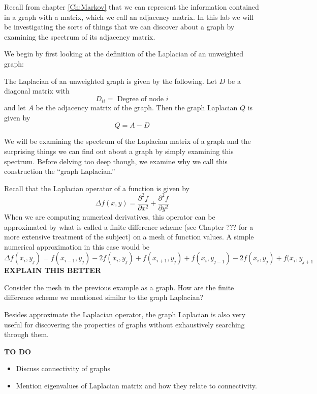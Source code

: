 \label{Ch:EigGraph}


Recall from chapter \ref{Ch:Markov} that we can represent the information contained in a graph with a matrix, which we call an adjacency matrix.  In this lab we will be investigating the sorts of things that we can discover about a graph by examining the spectrum of its adjacency matrix.

We begin by first looking at the definition of the Laplacian of an unweighted graph:
\begin{definition}  The Laplacian of an unweighted graph is given by the following.  Let $D$ be a diagonal matrix with
\[
D_{ii} = \mbox{ Degree of node $i$}
\]
and let $A$ be the adjacency matrix of the graph.  Then the graph Laplacian $Q$ is given by
\[
Q = A - D
\]
\end{definition}

We will be examining the spectrum of the Laplacian matrix of a graph and the surprising things we can find out about a graph by simply examining this spectrum.  Before delving too deep though, we examine why we call this construction the ``graph Laplacian.''

Recall that the Laplacian operator of a function is given by
\[
\Delta f(x,y) = \frac{\partial ^2 f}{\partial x^2} + \frac{\partial ^2 f}{\partial y^2}
\]
When we are computing numerical derivatives, this operator can be approximated by what is called a finite difference scheme (see Chapter ??? for a more extensive treatment of the subject) on a mesh of function values.  A simple numerical approximation in this case would be
\[
\Delta f(x_i,y_j) = f(x_{i-1},y_j) - 2f(x_i,y_j) + f(x_{i+1},y_j) + f(x_i,y_{j-1}) - 2f(x_i,y_j) + f(x_i,y_{j+1}
\]
{\bf EXPLAIN THIS BETTER}

\begin{problem} Consider the mesh in the previous example as a graph.  How are the finite difference scheme we mentioned similar to the graph Laplacian?
\end{problem}

Besides approximate the Laplacian operator, the graph Laplacian is also very useful for discovering the properties of graphs without exhaustively searching through them.

{\bf TO DO}
\begin{itemize}
\item Discuss connectivity of graphs
\item Mention eigenvalues of Laplacian matrix and how they relate to connectivity.
\end{itemize}

